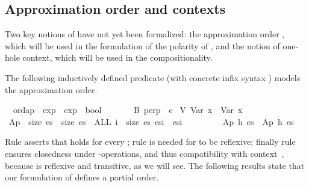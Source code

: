\documentclass{llncs}
\newenvironment{isacode}
{\begin{list}{}{
\setlength{\leftmargin}{4pt}
\setlength{\rightmargin}{0pt}
\setlength{\listparindent}{0pt}\raggedright
\setlength{\itemsep}{0pt}
\setlength{\parsep}{0pt}
\normalfont\ttfamily }\item[]}
{\end{list}}
\begin{document}
\subsection{Approximation order and contexts}\label{subsect:ordapContx}

Two key notions of \crwl{} have not yet been formalized: the
approximation order , which will be used in the formulation of
the polarity of \crwl, and the notion of one-hole context, which will
be used in the compositionality.

The following inductively defined predicate  (with
concrete infix syntax \isaelem{\isasymsqsubseteq}) models the
approximation order.

\medskip

\begin{minipage}{\linewidth}
\begin{isacode}
\isamarkupfalse \isanewline
\ \ ordap\ {\isacharcolon}{\isacharcolon}\ {\isachardoublequoteopen}exp\ {\isasymRightarrow}\ exp\ {\isasymRightarrow}\ bool{\isachardoublequoteclose}\ {\isacharparenleft}{\isachardoublequoteopen}{\isacharunderscore}\ {\isasymsqsubseteq}\ {\isacharunderscore}{\isachardoublequoteclose}\ {\isacharbrackleft}{}{}{\isacharcomma}{}{}{\isacharbrackright}\ {}{}{\isacharparenright}\isanewline
{}\isanewline
\ \ B{\isacharcolon}\ {\isachardoublequoteopen}perp\ {\isasymsqsubseteq}\ e{\isachardoublequoteclose}\isanewline
{\isacharbar}\ V{\isacharcolon}\ {\isachardoublequoteopen}Var\ x\ {\isasymsqsubseteq}\ Var\ x{\isachardoublequoteclose}\isanewline
{\isacharbar}\ Ap{\isacharcolon}\ {\isachardoublequoteopen}{\isasymlbrakk}\ size\ es\ {\isacharequal}\ size\ es{\isacharprime}\ {\isacharsemicolon}\ ALL\ i\ {\isacharless}\ size\ es{\isachardot}\ es{\isacharbang}i\ {\isasymsqsubseteq}\ es{\isacharprime}{\isacharbang}i\ {\isasymrbrakk}\isanewline
\ \ \ \ \ \ \ {\isasymLongrightarrow}\ Ap\ h\ es\ {\isasymsqsubseteq}\ Ap\ h\ es{\isacharprime}{\isachardoublequoteclose}\end{isacode}
\end{minipage}


\medskip

\noindent Rule  asserts that 
holds for every ; rule  is needed for
\isaelem{\isasymsqsubseteq} to be reflexive; finally rule 
ensures closedness under -operations, and thus compatibility
with context~\cite{BaaderNipkow-98}, because
\isaelem{\isasymsqsubseteq} is reflexive and transitive, as we will
see. The following results state that our formulation of
\isaelem{\isasymsqsubseteq} defines a partial order.
\end{document}
